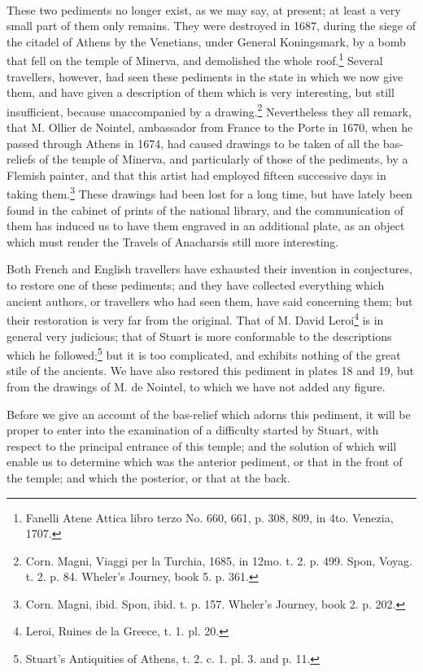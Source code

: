 \documentclass[a4paper, 11pt, oneside, polutonikogreek, english]{article}
\begin{document}
\paragraph{}
These two pediments no longer exist, as we may say, at present; at least a very small part of them only remains. They were destroyed in 1687, during the siege of the citadel of Athens by the Venetians, under General Koningsmark, by a bomb that fell on the temple of Minerva, and demolished the whole roof.\footnote{Fanelli Atene Attica libro terzo No. 660, 661, p. 308, 809, in 4to. Venezia, 1707.} Several travellers, however, had seen these pediments in the state in which we now give them, and have given a description of them which is very interesting, but still insufficient, because unaccompanied by a drawing.\footnote{Corn. Magni, Viaggi per la Turchia, 1685, in 12mo. t. 2. p. 499. Spon, Voyag. t. 2. p. 84. Wheler's Journey, book 5. p. 361.} Nevertheless they all remark, that M. Ollier de Nointel, ambassador from France to the Porte in 1670, when he passed through Athens in 1674, had caused drawings to be taken of all the bas-reliefs of the temple of Minerva, and particularly of those of the pediments, by a Flemish painter, and that this artist had employed fifteen successive days in taking them.\footnote{Corn. Magni, ibid. Spon, ibid. t. p. 157. Wheler's Journey, book 2. p. 202.} These drawings had been lost for a long time, but have lately been found in the cabinet of prints of the national library, and the communication of them has induced us to have them engraved in an additional plate, as an object which must render the Travels of Anacharsis still more interesting.

Both French and English travellers have exhausted their invention in conjectures, to restore one of these pediments; and they have collected everything which ancient authors, or travellers who had seen them, have said concerning them; but their restoration is very far from the original. That of M. David Leroi\footnote{Leroi, Ruines de la Greece, t. 1. pl. 20.} is in general very judicious; that of Stuart is more conformable to the descriptions which he followed;\footnote{Stuart's Antiquities of Athens, t. 2. c. 1. pl. 3. and p. 11.} but it is too complicated, and exhibits nothing of the great stile of the ancients. We have also restored this pediment in plates 18 and 19, but from the drawings of M. de Nointel, to which we have not added any figure.

Before we give an account of the bas-relief which adorns this pediment, it will be proper to enter into the examination of a difficulty started by Stuart, with respect to the principal entrance of this temple; and the solution of which will enable us to determine which was the anterior pediment, or that in the front of the temple; and which the posterior, or that at the back.
\end{document}
